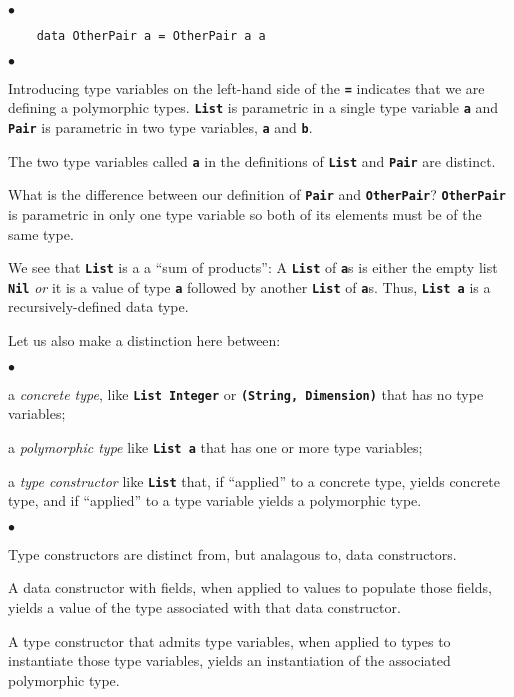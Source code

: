 \documentclass[12pt]{article}
\newcommand\code[1]{\texttt{\textbf{#1}}}
\newenvironment{notelist}{\begin{list}
   {$\bullet$}
   {\setlength{\itemsep}{0in}}}
   {\end{list}}
\begin{document}
\begin{notelist}
\begin{lstlisting}
    data OtherPair a = OtherPair a a
    \end{lstlisting}
    \begin{notelist}
        \item Introducing type variables on the left-hand side of the \code{=} indicates that we are
              defining a polymorphic types. \code{List} is parametric in a single type variable \code{a}
              and \code{Pair} is parametric in two type variables, \code{a} and \code{b}. 
        \item The two type variables called \code{a} in the definitions of \code{List} and \code{Pair} are
              distinct.
        \item What is the difference between our definition of \code{Pair} and \code{OtherPair}? \code{OtherPair}
              is parametric in only one type variable so both of its elements must be of the same type.
        \item We see that \code{List} is a a ``sum of products'': A \code{List} of \code{a}s is either
              the empty list \code{Nil} \textit{or} it is a value of type \code{a} followed by another
              \code{List} of \code{a}s. Thus, \code{List a} is a recursively-defined data type.
        \item Let us also make a distinction here between:
        \begin{notelist}
            \item a \textit{concrete type}, like \code{List Integer} or \code{(String, Dimension)} that has
                  no type variables;
            \item a \textit{polymorphic type} like \code{List a} that has one or more type variables;
            \item a \textit{type constructor} like \code{List} that, if ``applied'' to a concrete type,
                  yields concrete type, and if ``applied'' to a type variable yields a polymorphic type.
            \begin{notelist}
                \item Type constructors are distinct from, but analagous to, data constructors.
                \item A data constructor with fields, when applied to values to populate those fields, yields a
                      value of the type associated with that data constructor.
                \item A type constructor that admits type variables, when applied to types to instantiate those
                      type variables, yields an instantiation of the associated polymorphic type.
            \end{notelist}
        \end{notelist}
    \end{notelist}
\end{notelist}
\end{document}
